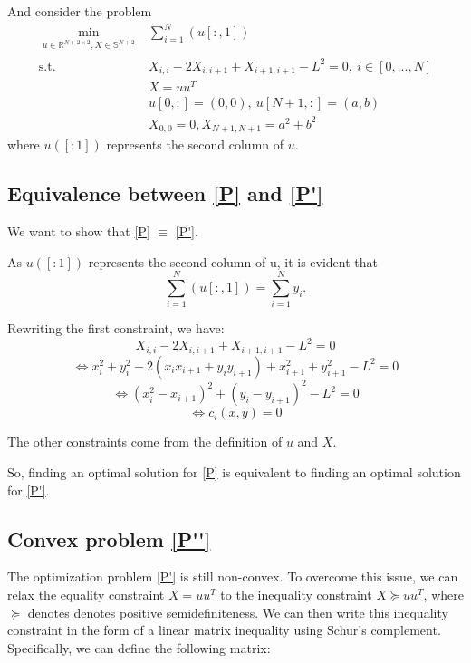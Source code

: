 \documentclass[10pt,a4paper,notitlepage,twocolumn]{article}
\begin{document}
And consider the problem
\begin{equation}\label{P'}
    \tag{$P'$}
    \begin{array}{cl}
     \underset{\substack{u \in \mathbb{R}^{N+2 \times 2}, X \in \mathbb{S}^{N+2}}}{\min} & \sum\limits_{i=1}^N (u[:,1]) \\
     \text{s.t.} & X_{i,i} - 2X_{i,i+1} + X_{i+1,i+1}-L^2=0,\ i \in [0,...,N] \\
     & X = uu^T \\
     & u[0,:] = (0,0),\ u[N+1,:]=(a,b) \\
     & X_{0,0}=0, X_{N+1,N+1}=a^2+b^2 
\end{array}
\end{equation}
where $u([:1])$ represents the second column of $u$.

\subsection{Equivalence between \eqref{P} and \eqref{P'}}

We want to show that \eqref{P} $\equiv$ \eqref{P'}.

As $u([:1])$ represents the second column of u, it is evident that 
\begin{equation*}
    \sum\limits_{i=1}^N (u[:,1]) = \sum\limits_{i=1}^N y_i.
\end{equation*}

Rewriting the first constraint, we have:
\begin{equation*}
    X_{i,i} - 2X_{i,i+1} + X_{i+1,i+1}-L^2=0
\end{equation*}
\begin{equation*}
    \iff x_i^2 + y_i^2 - 2(x_i x_{i+1} + y_i y_{i+1}) + x_{i+1}^2 + y_{i+1}^2 - L^2 = 0
\end{equation*}
\begin{equation*}
    \iff (x_i^2 - x_{i+1})^2 + (y_i - y_{i+1})^2 - L^2 = 0
\end{equation*}
\begin{equation*}
    \iff c_i(x,y) = 0
\end{equation*}

The other constraints come from the definition of $u$ and $X$.

So, finding an optimal solution for \eqref{P} is equivalent to finding an optimal solution for \eqref{P'}.

\subsection{Convex problem \eqref{P''}}
The optimization problem \eqref{P'} is still non-convex. To overcome this issue, we can relax the equality constraint $X = uu^T$ to the inequality constraint $X \succeq uu^T$, where $\succeq$ denotes denotes positive semidefiniteness. We can then write this inequality constraint in the form of a linear matrix inequality using Schur's complement. Specifically, we can define the following matrix:
\end{document}
